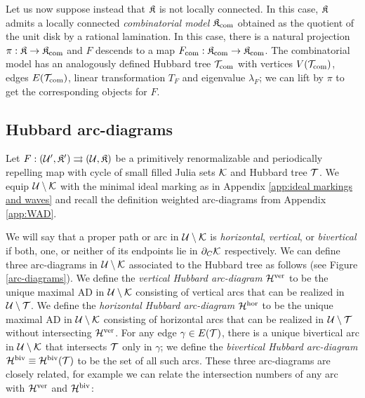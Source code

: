\documentclass[12pt]{amsart}
\begin{document}
Let us now suppose instead that $\mathfrak{K}$ is not locally connected. In this case, $\mathfrak{K}$ admits a locally connected \textit{combinatorial model} $\mathfrak{K}_{ \mathrm{com}}$ obtained as the quotient of the unit disk by a rational lamination. In this case, there is a natural projection $\pi: \mathfrak{K}\to \mathfrak{K}_{ \mathrm{com}}$ and $F$ descends to a map  $F_{ \mathrm{com}}: \mathfrak{K}_{ \mathrm{com}}\to \mathfrak{K}_{ \mathrm{com}}$.
The combinatorial model has an analogously defined Hubbard tree $\mathcal T_{ \mathrm{com}}$ with vertices $V(\mathcal T_{ \mathrm{com}})$, edges $E(\mathcal T_{ \mathrm{com}})$, linear transformation $T_F$ and eigenvalue $\lambda_F$; we can lift by $\pi$ to get the corresponding objects for $F$. 



\subsection{Hubbard arc-diagrams}


Let  $F: (\mathcal U', \mathfrak{K}')\rightrightarrows (\mathcal U, \mathfrak{K})$ be a primitively renormalizable and periodically repelling \pql map with cycle of small filled Julia sets $\mathcal K$ and Hubbard tree $\mathcal T$. 
We equip $\mathcal U\setminus \mathcal K$ with the minimal ideal marking as in Appendix \ref{app:ideal markings and waves} and recall the definition weighted arc-diagrams from Appendix \ref{app:WAD}.

We will say that a proper path or arc  in $\mathcal U\setminus \mathcal K$ is \textit{horizontal}, \textit{vertical}, or \textit{bivertical}
if both, one, or neither of its  endpoints lie in $\partial_C \mathcal K$ respectively.
We can define three arc-diagrams in $\mathcal U\setminus \mathcal K$ associated to the Hubbard tree as follows (see Figure \ref{arc-diagrams}). We define the \textit{vertical Hubbard arc-diagram}  $\mathcal H^{\mathrm{ver}}$ to be the unique maximal AD in $\mathcal U\setminus \mathcal K$ consisting of vertical arcs that can be realized in $\mathcal U\setminus \mathcal T$. 
We define the \textit{horizontal Hubbard arc-diagram}  $\mathcal H^{\mathrm{hor}}$ to be the unique maximal AD in $\mathcal U\setminus \mathcal K$ consisting of horizontal arcs that can be realized in $\mathcal U\setminus \mathcal T$ without intersecting $\mathcal H^{\mathrm{ver}}$.
For any edge $\gamma\in E(\mathcal T)$, there is a unique bivertical arc in $\mathcal U\setminus \mathcal K$ that intersects $\mathcal T$ only in $\gamma$;  we define the \textit{bivertical Hubbard arc-diagram} 
{$\mathcal H^{\mathrm{biv}}\equiv \mathcal H^{\mathrm{biv}} (\mathcal T)$}
to be the set of all such arcs.  
These three arc-diagrams are closely related, for example we can relate the intersection numbers of any arc with $\mathcal H^{\mathrm{ver}}$ and $\mathcal H^{\mathrm{biv}}$:
\end{document}
